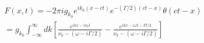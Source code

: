 \documentclass[aps,showpacs,groupedaddress]{revtex4}
\begin{document}
\begin{equation}
\label{eq1}
\begin{split}
F(x,t)=-2\pi ig_{k_{0}}e^{ik_{0}(x-ct)}e^{-(\Gamma/2)(ct-x)}\theta(ct-x)\\
=g_{k_{0}}\int_{-\infty}^{\infty}dk[\frac{e^{ikx-i\nu_{k}t}}{\nu_{k}-(\omega-i\Gamma/2)}-\frac{e^{ikx-i\omega t-\Gamma t/2}}{\nu_{k}-(\omega-i\Gamma/2)}]
\end{split}
\end{equation}
\end{document}
